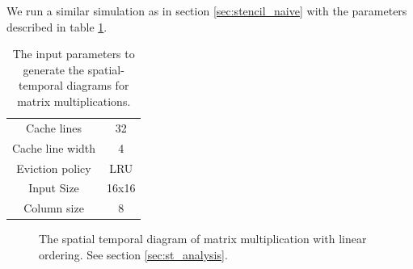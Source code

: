 We run a similar simulation as in section \ref{sec:stencil_naive} with the parameters described in table \ref{tab:sim_matrix_params}.

\begin{table}[H]
    \centering
    \begin{tabular}{|c c|}
        \hline
        Cache lines      & 32   \\
        Cache line width & 4    \\
        Eviction policy  & LRU  \\
        \hline
        Input Size       & 16x16\\
        Column size      & 8    \\
        \hline
    \end{tabular}
    \caption{
        The input parameters to generate the spatial-temporal diagrams for matrix multiplications.
    }
    \label{tab:sim_matrix_params}
\end{table}

\begin{figure}[H]
    \centering

    \caption{
        The spatial temporal diagram of matrix multiplication with linear ordering. 
        See section \ref{sec:st_analysis}.
    }
    \label{fig:st_matrix_naive}
\end{figure}

